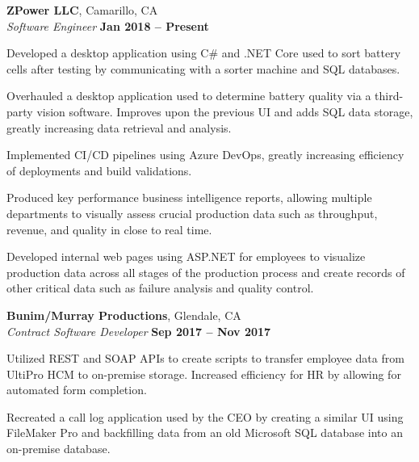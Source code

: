 \documentclass[margin,line,11pt]{resume}
\begin{document}
\begin{resume}
    \textbf{\listing ZPower LLC}, Camarillo, CA \vspace{2mm}\\\vspace{1mm}
    \textsl{Software Engineer} \hfill \textbf{Jan 2018 -- Present}\\
    \begin{list2}
        \item Developed a desktop application using C\# and .NET Core used to sort battery cells after testing by communicating with a sorter machine and SQL databases.
        \item Overhauled a desktop application used to determine battery quality via a third-party vision software. Improves upon the previous UI and adds SQL data storage, greatly increasing data retrieval and analysis.
        \item Implemented CI/CD pipelines using Azure DevOps, greatly increasing efficiency of deployments and build validations.
        \item Produced key performance business intelligence reports, allowing multiple departments to visually assess crucial production data such as throughput, revenue, and quality in close to real time.
        \item Developed internal web pages using ASP.NET for employees to visualize production data across all stages of the production process and create records of other critical data such as failure analysis and quality control.
    \end{list2}

    \textbf{\listing Bunim/Murray Productions}, Glendale, CA \vspace{2mm}\\\vspace{1mm}
    \textsl{Contract Software Developer} \hfill \textbf{Sep 2017 -- Nov 2017}\\
    \begin{list2}
        \item Utilized REST and SOAP APIs to create scripts to transfer employee data from UltiPro HCM to on-premise storage. Increased efficiency for HR by allowing for automated form completion.
        \item Recreated a call log application used by the CEO by creating a similar UI using FileMaker Pro and backfilling data from an old Microsoft SQL database into an on-premise database.
    \end{list2}
    


\end{resume}
\end{document}

